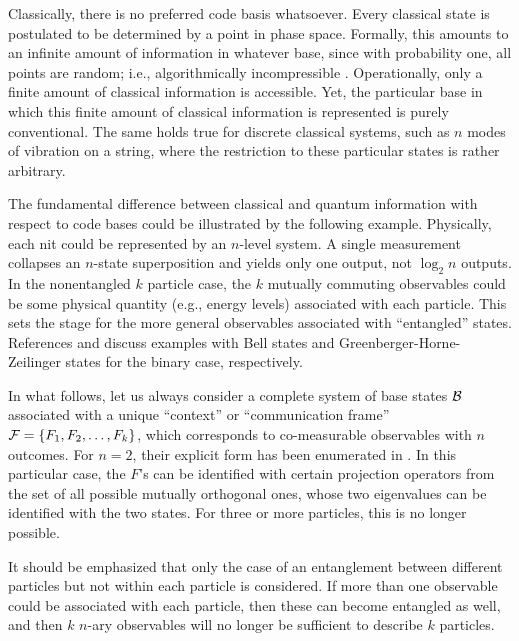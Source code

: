 Classically, there is no preferred code basis whatsoever.
Every classical state is postulated to be determined by a
point in phase space.
Formally, this amounts to an infinite amount of information in whatever base,
since
with probability one, all points are random; i.e., algorithmically incompressible
\cite{calude:94}.
Operationally, only a finite amount of classical information is accessible.
Yet, the particular base in which this
finite amount of classical information is represented
is purely conventional.
The same holds true for discrete classical systems,
such as $n$ modes of vibration on a string, where the restriction
to these particular states is rather arbitrary.

The fundamental difference between classical and quantum information
with respect to code bases
could be illustrated by the following example.
Physically, each nit could be
represented by an $n$-level system.
A single measurement collapses an $n$-state
superposition and yields only one output, not $\log_2 n$ outputs.
In the nonentangled $k$ particle case,
the $k$ mutually commuting observables
could be some physical quantity (e.g., energy levels) associated with each
particle.
This sets the stage for the more general observables
associated with ``entangled'' states.
References \cite{zeil-99} and \cite{DonSvo01} discuss
examples with Bell states and Greenberger-Horne-Zeilinger states
for the binary case, respectively.


In what follows, let us always consider a complete
system of base states  ${\cal B}$ associated with a unique ``context''
or ``communication frame''
 ${\cal F}=\{F_1,F_2, \ldots ,F_{k} \}$, which corresponds to
co-measurable observables with $n$ outcomes.
For $n=2$,
their explicit form has been enumerated in  \cite{DonSvo01}.
In this particular case, the $F$'s can be identified with certain projection
operators from the set of all possible mutually orthogonal ones,
whose two eigenvalues can be identified with the two states.
For three or more particles, this is no longer possible.

It should be emphasized that only the case of an entanglement between different particles
but not within each particle is considered.
If more than one observable could be associated with each particle,
then these can become entangled as well, and then $k$ $n$-ary observables will no longer
be sufficient to describe $k$ particles.



